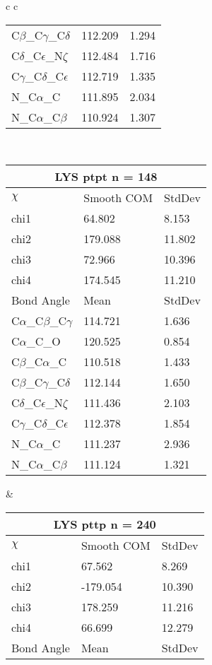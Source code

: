 \begin{longtable}{ c c }
\begin{tabular}{ l l l }
  C$\beta$\_C$\gamma$\_C$\delta$ & 112.209 & 1.294\\
  C$\delta$\_C$\epsilon$\_N$\zeta$ & 112.484 & 1.716\\
  C$\gamma$\_C$\delta$\_C$\epsilon$ & 112.719 & 1.335\\
  N\_C$\alpha$\_C & 111.895 & 2.034\\
  N\_C$\alpha$\_C$\beta$ & 110.924 & 1.307\\
  \bottomrule
  \end{tabular}
  \\
  \begin{tabular}{ l l l }
  \toprule
  \multicolumn{3}{c}{LYS \textbf{ptpt} n = 148} \\ \toprule
  $\chi$       & Smooth COM & StdDev \\ \midrule
  chi1 & 64.802 & 8.153 \\ 
  chi2 & 179.088 & 11.802 \\ 
  chi3 & 72.966 & 10.396 \\ 
  chi4 & 174.545 & 11.210 \\ \midrule
  Bond Angle   & Mean     & StdDev \\ \midrule
  C$\alpha$\_C$\beta$\_C$\gamma$ & 114.721 & 1.636\\
  C$\alpha$\_C\_O & 120.525 & 0.854\\
  C$\beta$\_C$\alpha$\_C & 110.518 & 1.433\\
  C$\beta$\_C$\gamma$\_C$\delta$ & 112.144 & 1.650\\
  C$\delta$\_C$\epsilon$\_N$\zeta$ & 111.436 & 2.103\\
  C$\gamma$\_C$\delta$\_C$\epsilon$ & 112.378 & 1.854\\
  N\_C$\alpha$\_C & 111.237 & 2.936\\
  N\_C$\alpha$\_C$\beta$ & 111.124 & 1.321\\
  \bottomrule
  \end{tabular}
  &
  \begin{tabular}{ l l l }
  \toprule
  \multicolumn{3}{c}{LYS \textbf{pttp} n = 240} \\ \toprule
  $\chi$       & Smooth COM & StdDev \\ \midrule
  chi1 & 67.562 & 8.269 \\ 
  chi2 & -179.054 & 10.390 \\ 
  chi3 & 178.259 & 11.216 \\ 
  chi4 & 66.699 & 12.279 \\ \midrule
  Bond Angle   & Mean     & StdDev \\ \midrule

\end{tabular}
\end{longtable}
